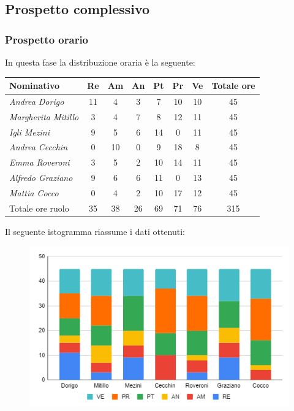 {{{{{{{{{{{{{{{		\subsection{Prospetto complessivo}\label{PreventivoFaseDiProgettazioneDiDettaglioECodificaComplessivo}

			\subsubsection{Prospetto orario}\label{PreventivoFaseDiProgettazioneDiDettaglioECodificaProspettoOrario}
			In questa fase la distribuzione oraria è la seguente:
			\quad
			\def\tabularxcolumn#1{m{#1}}
			{

				\begin{center}
					\renewcommand{\arraystretch}{1.4}
					\begin{tabularx}{\textwidth}{|X|c|c|c|c|c|c|c|}
						\hline
						\rowcolor{airforceblue}
						\textbf{Nominativo} & \textbf{Re} & \textbf{Am} & \textbf{An} & \textbf{Pt} & \textbf{Pr} & \textbf{Ve} & \textbf{Totale ore}\\
						\hline
						\textit{Andrea Dorigo} & 11 & 4 & 3 & 7 & 10 & 10 & 45\\
						\hline
						\textit{Margherita Mitillo} & 3 & 4 & 7 & 8 & 12 & 11 & 45\\
						\hline
						\textit{Igli Mezini} & 9 & 5 & 6 & 14 & 0 & 11 & 45\\
						\hline
						\textit{Andrea Cecchin} & 0 & 10 & 0 & 9 & 18 & 8 & 45\\
						\hline
						\textit{Emma Roveroni} & 3 & 5 & 2 & 10 & 14 & 11 & 45\\
						\hline
						\textit{Alfredo Graziano} & 9 & 6 & 6 & 11 & 0 & 13 & 45\\
						\hline
						\textit{Mattia Cocco} & 0 & 4 & 2 & 10 & 17 & 12 & 45\\
						\hline
						Totale ore ruolo & 35 & 38 & 26 & 69 & 71 & 76 & 315\\
						\hline
					\end{tabularx}
				\end{center}
				Il seguente istogramma riassume i dati ottenuti:
				\begin{figure}[!h]
					\begin{center}
						\includegraphics[width=0.7\linewidth]{../immagini/pdp/istogramma_progettazione_dettaglio.png}

\end{center}
\end{figure}}}}}}}}}}}}}}}}}
